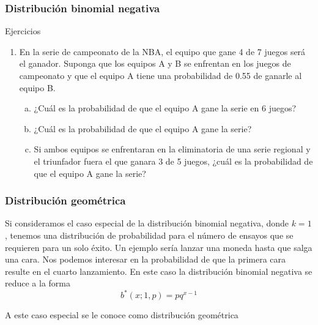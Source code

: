 \documentclass[spanish]{beamer}
\begin{document}
\begin{frame}
\frametitle{Distribución  binomial negativa}  
Ejercicios 
\begin{enumerate}
\item En la serie de campeonato de la NBA, el equipo que gane 4 de 7 juegos será el ganador. Suponga que los equipos A y B se enfrentan en los juegos de campeonato y que el equipo A tiene una probabilidad de 0.55 de ganarle al equipo B.
\begin{enumerate}[(a)]
\item ¿Cuál es la probabilidad de que el equipo A gane la serie en 6 juegos?
\item  ¿Cuál es la probabilidad de que el equipo A gane la serie?
\item  Si ambos equipos se enfrentaran en la eliminatoria de una serie regional y el triunfador fuera el que ganara 3 de 5 juegos, ¿cuál es la probabilidad de que el equipo A
gane la serie?
\end{enumerate}
\end{enumerate}
\end{frame}

\begin{frame}
\frametitle{Distribución geométrica}  
Si consideramos el caso especial de la distribución binomial negativa,
donde $k = 1$, tenemos una distribución de probabilidad para el número de ensayos que
se requieren para un solo éxito. Un ejemplo sería lanzar una moneda hasta que salga
una cara. Nos podemos interesar en la probabilidad de que la primera cara resulte en el
cuarto lanzamiento. En este caso la distribución binomial negativa se reduce a la forma
\begin{equation*}
b^{*} (x; 1, p) =pq^{x-1} 
\end{equation*}

A este caso especial se le conoce como distribución geométrica
\end{frame}
\end{document}
